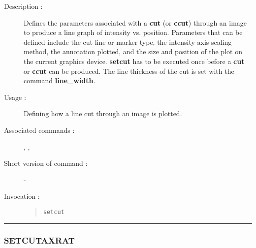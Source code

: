 \begin{description}

\item[Description :] Defines the parameters associated with a {\bf cut}
(or {\bf ccut}) through an image to produce a line graph of intensity
vs. position.  Parameters that can be defined include the cut line or
marker type, the intensity axis scaling method, the annotation plotted,
and the size and position of the plot on the current graphics device.
{\bf setcut} has to be executed once before a {\bf cut} or {\bf ccut}
can be produced.  The line thickness of the cut is set with the command
{\bf line\_width}.

\item[Usage :] Defining how a line cut through an image is plotted.

\item[Associated commands :] {\tt {}},
{\tt {}}, {\tt {}}

\item[Short version of command :] -
\item[Invocation :]

\begin{quote}{\tt  setcut }\end{quote}

\end{description}

\hrule
\subsubsection*{\label{SETCUTAXRAT}SETCUTAXRAT}

